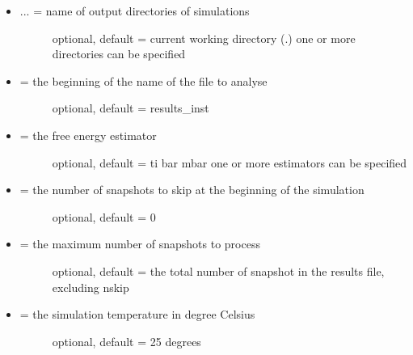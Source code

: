 \documentclass[letterpaper,10pt,english]{sphinxmanual}
\begin{document}
\begin{itemize}
\item {} \begin{description}
\item[{ ... = name of output directories of simulations}] \leavevmode
optional, default = current working directory (.)
one or more directories can be specified

\end{description}

\item {} \begin{description}
\item[{ = the beginning of the name of the file to analyse}] \leavevmode
optional, default = results\_inst

\end{description}

\item {} \begin{description}
\item[{ = the free energy estimator}] \leavevmode
optional, default = ti bar mbar
one or more estimators can be specified

\end{description}

\item {} \begin{description}
\item[{ = the number of snapshots to skip at the beginning of the simulation}] \leavevmode
optional, default = 0

\end{description}

\item {} \begin{description}
\item[{ = the maximum number of snapshots to process}] \leavevmode
optional, default = the total number of snapshot in the results file, excluding nskip

\end{description}

\item {} \begin{description}
\item[{ = the simulation temperature in degree Celsius}] \leavevmode
optional, default = 25 degrees


\end{description}
\end{itemize}
\end{document}
